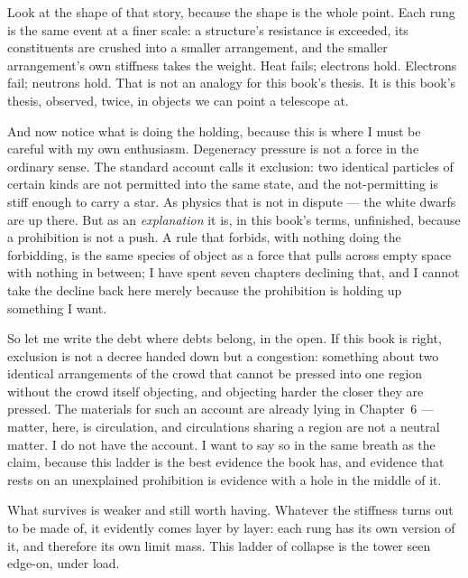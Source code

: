Look at the shape of that story, because the shape is the whole point. Each rung is the same event at a finer scale: a structure's resistance is exceeded, its constituents are crushed into a smaller arrangement, and the smaller arrangement's own stiffness takes the weight. Heat fails; electrons hold. Electrons fail; neutrons hold. That is not an analogy for this book's thesis. It is this book's thesis, observed, twice, in objects we can point a telescope at.

And now notice what is doing the holding, because this is where I must be careful with my own enthusiasm. Degeneracy pressure is not a force in the ordinary sense. The standard account calls it exclusion: two identical particles of certain kinds are not permitted into the same state, and the not-permitting is stiff enough to carry a star. As physics that is not in dispute --- the white dwarfs are up there. But as an \emph{explanation} it is, in this book's terms, unfinished, because a prohibition is not a push. A rule that forbids, with nothing doing the forbidding, is the same species of object as a force that pulls across empty space with nothing in between; I have spent seven chapters declining that, and I cannot take the decline back here merely because the prohibition is holding up something I want.

So let me write the debt where debts belong, in the open. If this book is right, exclusion is not a decree handed down but a congestion: something about two identical arrangements of the crowd that cannot be pressed into one region without the crowd itself objecting, and objecting harder the closer they are pressed. The materials for such an account are already lying in Chapter~6 --- matter, here, is circulation, and circulations sharing a region are not a neutral matter. I do not have the account. I want to say so in the same breath as the claim, because this ladder is the best evidence the book has, and evidence that rests on an unexplained prohibition is evidence with a hole in the middle of it.

What survives is weaker and still worth having. Whatever the stiffness turns out to be made of, it evidently comes layer by layer: each rung has its own version of it, and therefore its own limit mass. This ladder of collapse is the tower seen edge-on, under load.

